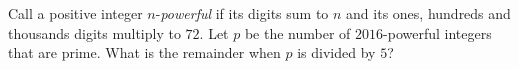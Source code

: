 Call a positive integer $n$-\emph{powerful} if its digits sum to $n$ and its ones, hundreds and thousands digits multiply to $72$. Let $p$ be the number of $2016$-powerful integers that are prime. What is the remainder when $p$ is divided by $5$?
